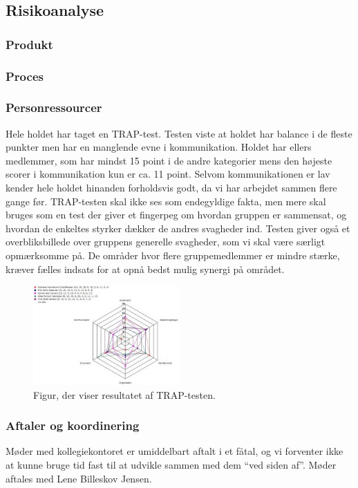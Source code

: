 \documentclass[12pt, a4paper]{report}
\begin{document}
\subsection{Risikoanalyse}
\subsubsection{Produkt}

\subsubsection{Proces}

\subsubsection{Personressourcer}
Hele holdet har taget en TRAP-test. Testen viste at holdet har balance i de fleste punkter men har en manglende evne i kommunikation. Holdet har ellers medlemmer, som har mindst 15 point i de andre kategorier mens den højeste scorer i kommunikation kun er ca. 11 point. Selvom kommunikationen er lav kender hele holdet hinanden forholdsvis godt, da vi har arbejdet sammen flere gange før.
TRAP-testen skal ikke ses som endegyldige fakta, men mere skal bruges som en test der giver et fingerpeg om hvordan gruppen er sammensat, og hvordan de enkeltes styrker dækker de andres svagheder ind. Testen giver også et overbliksbillede over gruppens generelle svagheder, som vi skal være særligt opmærksomme på. De områder hvor flere gruppemedlemmer er mindre stærke, kræver fælles indsats for at opnå bedst mulig synergi på området.

\begin{figure}[h!]
\includegraphics[width=0.5\textwidth]{itsaTRAP}
\caption{Figur, der viser resultatet af TRAP-testen.}
\end{figure}

\subsubsection{Aftaler og koordinering}
Møder med kollegiekontoret er umiddelbart aftalt i et fåtal, og vi forventer ikke at kunne bruge tid fast til at udvikle sammen med dem “ved siden af”. Møder aftales med Lene Billeskov Jensen.
\end{document}
